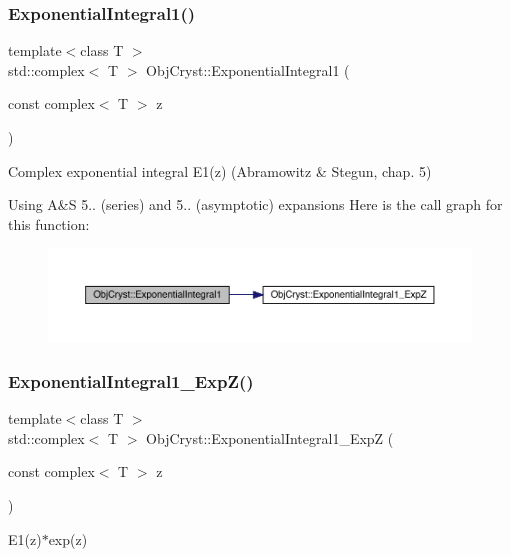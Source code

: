 \subsubsection{\texorpdfstring{ExponentialIntegral1()}{ExponentialIntegral1()}}
{\footnotesize\ttfamily template$<$class T $>$ \\
std\+::complex$<$ T $>$ Obj\+Cryst\+::\+Exponential\+Integral1 (\begin{DoxyParamCaption}\item[{const complex$<$ T $>$}]{z }\end{DoxyParamCaption})}

Complex exponential integral E1(z) (Abramowitz \& Stegun, chap. 5)

Using A\&S 5.. (series) and 5.. (asymptotic) expansions Here is the call graph for this function\+:
\nopagebreak
\begin{figure}[H]
\begin{center}
\leavevmode
\includegraphics[width=350pt]{namespace_obj_cryst_abc463ee467fb2171653c5967dbb41c30_cgraph}
\end{center}
\end{figure}
\mbox{\label{namespace_obj_cryst_a74bf8a13319fe6f59d1bcd6da225a175}} 
\subsubsection{\texorpdfstring{ExponentialIntegral1\_ExpZ()}{ExponentialIntegral1\_ExpZ()}}
{\footnotesize\ttfamily template$<$class T $>$ \\
std\+::complex$<$ T $>$ Obj\+Cryst\+::\+Exponential\+Integral1\+\_\+\+ExpZ (\begin{DoxyParamCaption}\item[{const complex$<$ T $>$}]{z }\end{DoxyParamCaption})}

E1(z)$\ast$exp(z)

